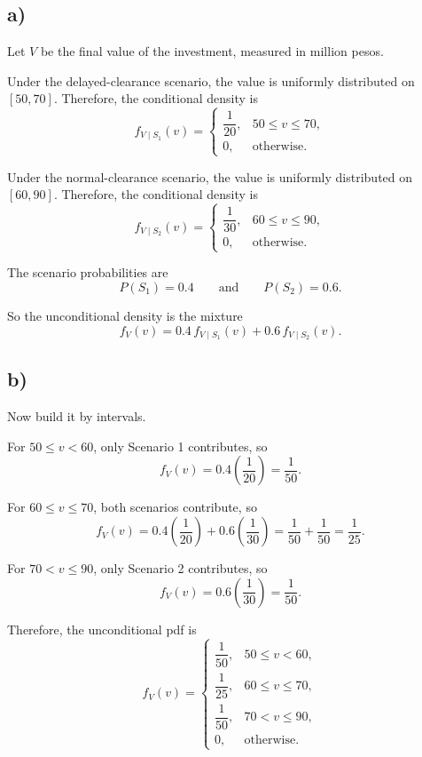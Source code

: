 \subsection*{a)}
Let $V$ be the final value of the investment, measured in million pesos.

Under the delayed-clearance scenario, the value is uniformly distributed on $[50,70]$. Therefore, the conditional density is
\[
f_{V\mid S_1}(v)=
\begin{cases}
	\dfrac{1}{20}, & 50\le v\le 70,\\[4pt]
	0, & \text{otherwise.}
\end{cases}
\]

Under the normal-clearance scenario, the value is uniformly distributed on $[60,90]$. Therefore, the conditional density is
\[
f_{V\mid S_2}(v)=
\begin{cases}
	\dfrac{1}{30}, & 60\le v\le 90,\\[4pt]
	0, & \text{otherwise.}
\end{cases}
\]

The scenario probabilities are
\[
P(S_1)=0.4
\qquad \text{and} \qquad
P(S_2)=0.6.
\]

So the unconditional density is the mixture
\[
f_V(v)=0.4\,f_{V\mid S_1}(v)+0.6\,f_{V\mid S_2}(v).
\]

\subsection*{b)}
Now build it by intervals.

For $50\le v<60$, only Scenario 1 contributes, so
\[
f_V(v)=0.4\left(\frac{1}{20}\right)=\frac{1}{50}.
\]

For $60\le v\le 70$, both scenarios contribute, so
\[
f_V(v)=0.4\left(\frac{1}{20}\right)+0.6\left(\frac{1}{30}\right)
=\frac{1}{50}+\frac{1}{50}
=\frac{1}{25}.
\]

For $70<v\le 90$, only Scenario 2 contributes, so
\[
f_V(v)=0.6\left(\frac{1}{30}\right)=\frac{1}{50}.
\]

Therefore, the unconditional pdf is
\[
f_V(v)=
\begin{cases}
	\dfrac{1}{50}, & 50\le v<60,\\[6pt]
	\dfrac{1}{25}, & 60\le v\le 70,\\[6pt]
	\dfrac{1}{50}, & 70<v\le 90,\\[6pt]
	0, & \text{otherwise.}
\end{cases}
\]

